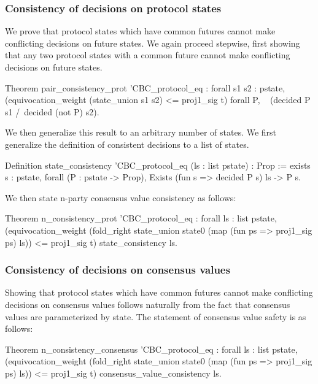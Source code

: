 \documentclass[runningheads]{llncs}
\begin{document}
\subsubsection{Consistency of decisions on protocol states}
We prove that protocol states which have common futures cannot make conflicting decisions on future states. We again proceed stepwise, first showing that any two protocol states with a common future cannot make conflicting decisions on future states.
\begin{coq}
	Theorem pair_consistency_prot '{CBC_protocol_eq} :
	forall s1 s2 : pstate,
	(equivocation_weight (state_union s1 s2) <= proj1_sig t)%
	forall P,
	~ (decided P s1 /\ decided (not P) s2).
\end{coq}
We then generalize this result to an arbitrary number of states. We first generalize the definition of consistent decisions to a list of states.
\begin{coq}
	Definition state_consistency '{CBC_protocol_eq}
	(ls : list pstate) : Prop :=
	exists s : pstate,
	forall (P : pstate -> Prop),
	Exists (fun s => decided P s) ls ->
	P s.
\end{coq}
We then state n-party consensus value consistency as follows:
\begin{coq}
	Theorem n_consistency_prot '{CBC_protocol_eq} :
	forall ls : list pstate,
	(equivocation_weight (fold_right state_union state0
	(map (fun ps => proj1_sig ps) ls)) <= proj1_sig t)%
	state_consistency ls.
\end{coq}

\subsubsection{Consistency of decisions on consensus values}
Showing that protocol states which have common futures cannot make conflicting decisions on consensus values follows naturally from the fact that consensus values are parameterized by state. The statement of consensus value safety is as follows:
\begin{coq}
	Theorem n_consistency_consensus '{CBC_protocol_eq} :
	forall ls : list pstate,
	(equivocation_weight (fold_right state_union state0
	(map (fun ps => proj1_sig ps) ls)) <= proj1_sig t)%
	consensus_value_consistency ls.
\end{coq}
\end{document}
